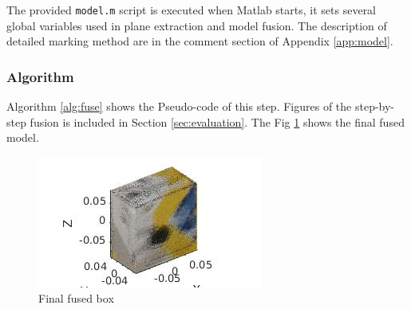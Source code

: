 \documentclass[10pt,a4paper]{article}
\begin{document}
The provided {\tt model.m} script is executed when Matlab starts, it sets several global variables used in plane extraction and model fusion.
The description of detailed marking method are in the comment section of Appendix \ref{app:model}.

\subsubsection{Algorithm}
\label{sec:thatonewithfinalimage}

Algorithm \ref{alg:fuse} shows the Pseudo-code of this step. Figures of the step-by-step fusion is included in Section \ref{sec:evaluation}. The Fig \ref{fig:6} shows the final fused model.

\vspace{-10pt}
\hspace{-40pt}
\begin{figure}[!h]
		\centering
		\includegraphics[scale=0.5]{box/49.jpg}
		\caption{ \small Final fused box}
		\label{fig:6}
\end{figure} 
\end{document}
